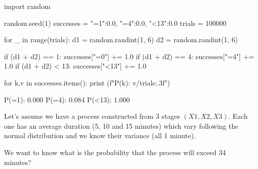 \cprotEnv\begin{solution}
\begin{ipython}
import random

random.seed(1)
successes = {"=1":0.0, "=4":0.0, "<13":0.0}
trials = 100000

for _ in range(trials):
    d1 = random.randint(1, 6)
    d2 = random.randint(1, 6)

    if (d1 + d2) == 1:
        successes["=0"] += 1.0
    if (d1 + d2) == 4:
        successes["=4"] += 1.0
    if (d1 + d2) < 13:
        successes["<13"] += 1.0

for k,v in successes.items():
    print (f"P({k}): {v/trials:.3f}")
\end{ipython}
\begin{ioutput}
P(=1): 0.000
P(=4): 0.084
P(<13): 1.000
\end{ioutput}
\end{solution}

\begin{question}
Let’s assume we have a process constructed from 3 stages $(X1, X2, X3)$. Each one has an average duration (5, 10 and 15 minutes) which vary following the normal distribution and we know their variance (all 1 minute).

We want to know what is the probability that the process will exceed 34 minutes?
\end{question}

